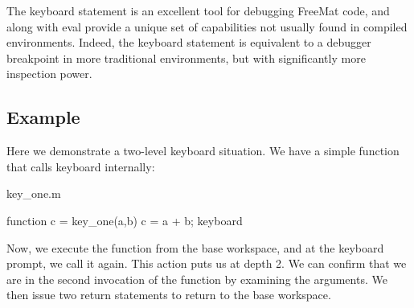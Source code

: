 The {\ttfamily keyboard} statement is an excellent tool for debugging Free\-Mat code, and along with {\ttfamily eval} provide a unique set of capabilities not usually found in compiled environments. Indeed, the {\ttfamily keyboard} statement is equivalent to a debugger breakpoint in more traditional environments, but with significantly more inspection power. \hypertarget{variables_struct_Example}{}\subsection{Example}\label{variables_struct_Example}
Here we demonstrate a two-\/level {\ttfamily keyboard} situation. We have a simple function that calls {\ttfamily keyboard} internally\-:

\begin{DoxyVerb}     key_one.m
\end{DoxyVerb}



\begin{DoxyVerbInclude}
function c = key_one(a,b)
c = a + b;
keyboard
\end{DoxyVerbInclude}


Now, we execute the function from the base workspace, and at the {\ttfamily keyboard} prompt, we call it again. This action puts us at depth 2. We can confirm that we are in the second invocation of the function by examining the arguments. We then issue two {\ttfamily return} statements to return to the base workspace.


